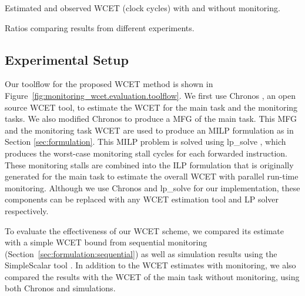 \begin{table}[htb]
  \begin{center}
    \begin{scriptsize}
    
    \end{scriptsize}
    \vspace{-0.1in}
    \caption{Estimated and observed WCET (clock cycles) with and without monitoring.}
    \label{tab:evaluation.wcet}
    \vspace{-0.2in}
  \end{center}
\end{table}

\begin{table}[htb]
  \begin{center}
    \begin{tiny}
    
    \end{tiny}
    \vspace{-0.1in}
    \caption{Ratios comparing results from different experiments.} \label{tab:evaluation.ratios}
    \vspace{-0.3in}
  \end{center}
\end{table}

\vspace{-0.0in}
\subsection{Experimental Setup}

Our toolflow for the proposed WCET method is shown in Figure~\ref{fig:monitoring_wcet.evaluation.toolflow}. We
first use Chronos \cite{chronos-tool}, an open source WCET tool, to estimate
the WCET for the main task and the monitoring tasks. We also modified Chronos
to produce a MFG of the main task. This MFG and the monitoring task WCET are used to produce an MILP formulation as in
Section \ref{sec:formulation}. This MILP problem is solved
using lp\_solve \cite{lpsolve}, which produces the worst-case monitoring stall cycles for each forwarded
instruction. These monitoring stalls are combined into the ILP formulation that 
is originally generated for the main task to estimate the overall
WCET with parallel run-time monitoring. Although we use Chronos and lp\_solve
for our implementation, these components can be replaced with any WCET
estimation tool and LP solver respectively.

To evaluate the effectiveness of our WCET scheme, we compared its estimate
with a simple WCET bound from sequential monitoring (Section~\ref{sec:formulation:sequential})
as well as simulation results using the SimpleScalar tool \cite{simplescalar}.
In addition to the WCET estimates with monitoring, we also compared the results with
the WCET of the main task without monitoring, using both Chronos and simulations. 

